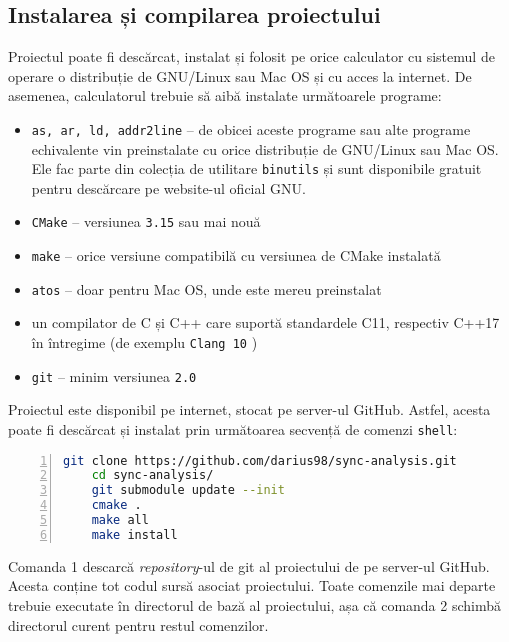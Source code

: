 \subsection{Instalarea și compilarea proiectului}
Proiectul poate fi descărcat, instalat și folosit pe orice calculator cu
sistemul de operare o distribuție de GNU/Linux sau Mac OS și cu acces
la internet. De asemenea, calculatorul trebuie să aibă instalate
următoarele programe:
\begin{itemize}
    \item \lstinline{as, ar, ld, addr2line} -- de obicei aceste programe
    sau alte programe echivalente vin preinstalate cu orice distribuție
    de GNU/Linux sau Mac OS. Ele fac parte din colecția de utilitare
    \lstinline{binutils}\cite{binutils} și sunt disponibile gratuit
    pentru descărcare pe website-ul oficial GNU\cite{GNUWebsite}.
    \item \lstinline{CMake}\cite{CMake} -- versiunea \lstinline{3.15}
    sau mai nouă
    \item \lstinline{make} -- orice versiune compatibilă cu versiunea de
    CMake instalată
    \item \lstinline{atos}\cite{atos} -- doar pentru Mac OS, unde este
    mereu preinstalat
    \item un compilator de C și C++ care suportă standardele C11,
    respectiv C++17 în întregime (de exemplu \lstinline{Clang 10}
    \cite{Clang})
    \item \lstinline{git}\cite{git} -- minim versiunea \lstinline{2.0}
\end{itemize}

Proiectul este disponibil pe internet, stocat pe server-ul GitHub.
Astfel, acesta poate fi descărcat și instalat prin următoarea secvență
de comenzi \lstinline{shell}:

\begin{lstlisting}[language=bash,
                   numbers=left,
                   xleftmargin=3em,
                   caption=Instrucțiuni pentru instalarea proiectului]
    git clone https://github.com/darius98/sync-analysis.git
    cd sync-analysis/
    git submodule update --init
    cmake .
    make all
    make install
\end{lstlisting}

Comanda 1 descarcă \textit{repository}-ul de git al proiectului de pe
server-ul GitHub. Acesta conține tot codul sursă asociat proiectului.
Toate comenzile mai departe trebuie executate în directorul de bază al
proiectului, așa că comanda 2 schimbă directorul curent pentru restul
comenzilor.


